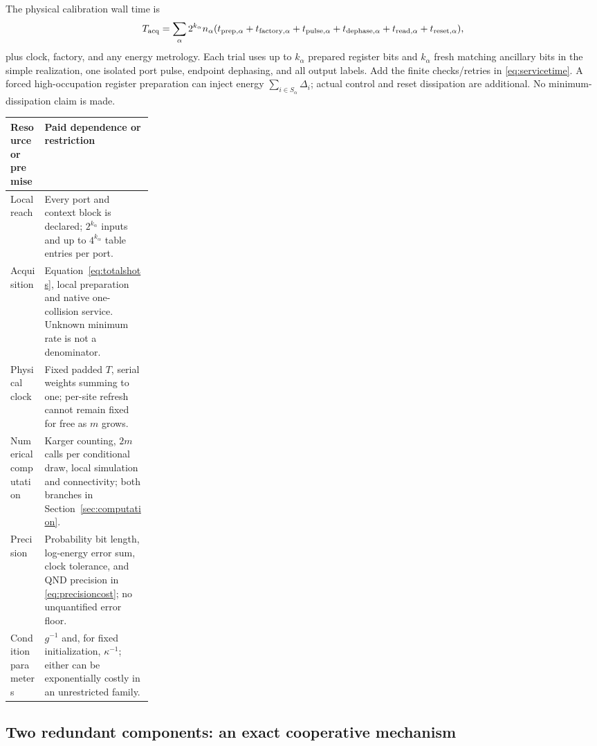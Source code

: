 \documentclass[10pt,a4paper]{article}
\theoremstyle{definition}\newtheorem{assumption}[theorem]{Assumption}
\begin{document}
The physical calibration wall time is
\begin{equation}
 T_{\rm acq}=\sum_\alpha 2^{k_\alpha}n_\alpha
 (t_{\rm prep,\alpha}+t_{\rm factory,\alpha}+t_{\rm pulse,\alpha}
  +t_{\rm dephase,\alpha}+t_{\rm read,\alpha}+t_{\rm reset,\alpha}),
 \label{eq:wallbill}
\end{equation}
plus clock, factory, and any energy metrology. Each trial uses up to $k_\alpha$ prepared register bits and $k_\alpha$ fresh matching ancillary bits in the simple realization, one isolated port pulse, endpoint dephasing, and all output labels. Add the finite checks/retries in \eqref{eq:servicetime}. A forced high-occupation register preparation can inject energy $\sum_{i\in S_\alpha}\Delta_i$; actual control and reset dissipation are additional. No minimum-dissipation claim is made.

\begin{center}
\small
\begin{tabularx}{\linewidth}{@{}p{0.24\linewidth}X@{}}
\toprule
Resource or premise & Paid dependence or restriction\\
\midrule
Local reach & Every port and context block is declared; $2^{k_\alpha}$ inputs and up to $4^{k_\alpha}$ table entries per port.\\
Acquisition & Equation~\eqref{eq:totalshots}, local preparation and native one-collision service. Unknown minimum rate is not a denominator.\\
Physical clock & Fixed padded $T$, serial weights summing to one; per-site refresh cannot remain fixed for free as $m$ grows.\\
Numerical computation & Karger counting, $2m$ calls per conditional draw, local simulation and connectivity; both branches in Section~\ref{sec:computation}.\\
Precision & Probability bit length, log-energy error sum, clock tolerance, and QND precision in \eqref{eq:precisioncost}; no unquantified error floor.\\
Condition parameters & $g^{-1}$ and, for fixed initialization, $\kappa^{-1}$; either can be exponentially costly in an unrestricted family.\\
\bottomrule
\end{tabularx}
\end{center}

\subsection{Two redundant components: an exact cooperative mechanism}
\end{document}
